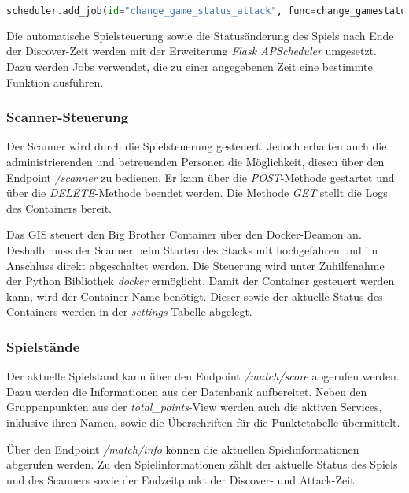\begin{lstlisting}[language=Python, frame=single, caption={GIS Scheduler Jobs}, captionpos=b, label={lst:gis-scheduler-jobs}]
scheduler.add_job(id="change_game_status_attack", func=change_gamestatus, trigger='date', run_date=discover_end_datetime)
\end{lstlisting}

Die automatische Spielsteuerung sowie die Statusänderung des Spiels nach Ende der Discover-Zeit werden mit der Erweiterung \textit{Flask APScheduler} umgesetzt. Dazu werden Jobs verwendet, die zu einer angegebenen Zeit eine bestimmte Funktion ausführen.

\subsubsection{Scanner-Steuerung}
Der Scanner wird durch die Spielsteuerung gesteuert. Jedoch erhalten auch die administrierenden und betreuenden Personen die Möglichkeit, diesen über den Endpoint \textit{/scanner} zu bedienen.
Er kann über die \textit{POST}-Methode gestartet und über die \textit{DELETE}-Methode beendet werden. Die Methode \textit{GET} stellt die Logs des Containers bereit.

Das GIS steuert den Big Brother Container über den Docker-Deamon an. Deshalb muss der Scanner beim Starten des Stacks mit hochgefahren und im Anschluss direkt abgeschaltet \linebreak werden. Die Steuerung wird unter Zuhilfenahme der Python Bibliothek \textit{docker} ermöglicht. Damit der Container gesteuert werden kann, wird der Container-Name benötigt. Dieser sowie der aktuelle Status des Containers werden in der \textit{settings}-Tabelle abgelegt.

\subsubsection{Spielstände}
Der aktuelle Spielstand kann über den Endpoint \textit{/match/score} abgerufen werden. Dazu werden die Informationen aus der Datenbank aufbereitet. Neben den Gruppenpunkten aus der \textit{total\_points}-View werden auch die aktiven Services, inklusive ihren Namen, sowie die  \linebreak Überschriften für die Punktetabelle übermittelt.

Über den Endpoint \textit{/match/info} können die aktuellen Spielinformationen abgerufen werden. Zu den Spielinformationen zählt der aktuelle Status des Spiels und des Scanners sowie der Endzeitpunkt der Discover- und Attack-Zeit.


